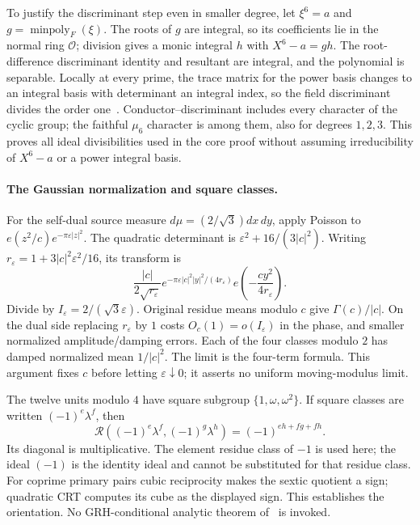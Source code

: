 To justify the discriminant step even in smaller degree, let
$\xi^6=a$ and $g=\operatorname{minpoly}_F(\xi)$.
The roots of $g$ are integral, so its coefficients lie in the normal ring
$\mathcal O$; division gives a monic integral $h$ with $X^6-a=gh$.
The root-difference discriminant identity and resultant are integral,
and the polynomial is separable. Locally at every prime, the trace
matrix for the power basis changes to an integral basis with determinant
an integral index, so the field discriminant divides the order
one~\cite[Proposition 2.11, Lemma 2.23 and Proposition 2.34]{milneant}.
Conductor--discriminant includes every character of the cyclic group;
the faithful $\mu_6$ character is among them, also for degrees $1,2,3$.
This proves all ideal divisibilities used in the core proof without
assuming irreducibility of $X^6-a$ or a power integral basis.

\paragraph{The Gaussian normalization and square classes.}
For the self-dual source measure $d\mu=(2/\sqrt3)dx\,dy$, apply Poisson
to $e(z^2/c)e^{-\pi\varepsilon|z|^2}$. The quadratic determinant is
$\varepsilon^2+16/(3|c|^2)$. Writing
$r_\varepsilon=1+3|c|^2\varepsilon^2/16$, its transform is
\[
 \frac{|c|}{2\sqrt{r_\varepsilon}}
 e^{-\pi\varepsilon |c|^2|y|^2/(4r_\varepsilon)}
 e\!\left(-\frac{cy^2}{4r_\varepsilon}\right).
\]
Divide by $I_\varepsilon=2/(\sqrt3\varepsilon)$.
Original residue means modulo $c$ give $\Gamma(c)/|c|$.
On the dual side replacing $r_\varepsilon$ by $1$ costs
$O_c(1)=o(I_\varepsilon)$ in the phase, and smaller normalized
amplitude/damping errors. Each of the four classes modulo $2$ has
damped normalized mean $1/|c|^2$.
The limit is the four-term formula. This argument fixes $c$ before
letting $\varepsilon\downarrow0$; it asserts no uniform moving-modulus limit.

The twelve units modulo $4$ have square subgroup
$\{1,\omega,\omega^2\}$. If square classes are written
$(-1)^e\lambda^f$, then
\[
 \mathcal R((-1)^e\lambda^f,(-1)^g\lambda^h)=(-1)^{eh+fg+fh}.
\]
Its diagonal is multiplicative. The element residue class of $-1$
is used here; the ideal $(-1)$ is the identity ideal and cannot be
substituted for that residue class. For coprime primary pairs cubic
reciprocity makes the sextic quotient a sign; quadratic CRT computes
its cube as the displayed sign. This establishes the orientation.
No GRH-conditional analytic theorem of~\cite{dunnradziwill} is invoked.


